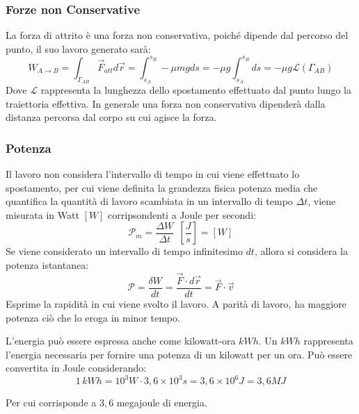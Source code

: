 \documentclass{article}
\numberwithin{equation}{subsection}
\begin{document}
\subsubsection{Forze non Conservative}
La forza di attrito è una forza non conservativa, poiché dipende 
dal percorso del punto, il suo lavoro generato sarà:
\begin{equation}
    W_{A\to B}=\displaystyle\int_{\Gamma_{AB}}\vec{F}_{att}d\vec{r}=\int_{s_A}^{s_B}-\mu mgds=-\mu g\int_{s_A}^{s_B}ds=-\mu g\mathscr{L}(\Gamma_{AB})
\end{equation}
Dove $\mathscr{L}$ rappresenta la lunghezza dello spostamento effettuato dal punto lungo la traiettoria effettiva. In generale una forza non conservativa dipenderà dalla distanza percorsa dal corpo 
su cui agisce la forza. 

\subsubsection{Potenza}
Il lavoro non considera l'intervallo di tempo in cui viene effettuato 
lo spostamento, per cui viene definita la grandezza fisica potenza media 
che quantifica la quantità di lavoro scambiata in un intervallo 
di tempo $\Delta t$, viene misurata in Watt $[W]$ corripsondenti a Joule per secondi: 
\begin{equation*}
    \mathscr{P}_{m}=\displaystyle\frac{\Delta W}{\Delta t}\:\:\left[\displaystyle\frac{J}{s}\right]=[W]
\end{equation*}
Se viene considerato un intervallo di tempo infinitesimo $dt$, allora 
si considera la potenza istantanea:
\begin{equation}
    \mathscr{P}=\displaystyle\frac{\delta W}{dt}=\frac{\vec{F}\cdot d\vec{r}}{dt}=\vec{F}\cdot\vec{v}
\end{equation}
Esprime la rapidità in cui viene svolto il lavoro. A parità di lavoro, ha maggiore potenza ciò che lo eroga in minor tempo.  


L'energia può essere espressa anche come kilowatt-ora $kWh$. Un $kWh$ rappresenta l'energia necessaria per fornire una potenza di un kilowatt per un ora. Può essere 
convertita in Joule considerando:
\begin{equation*}
    1\,kWh=10^3W\cdot3,6\times10^3s=3,6\times10^6J=3,6MJ
\end{equation*}

Per cui corrisponde a $3,6$ megajoule di energia. 
\end{document}
